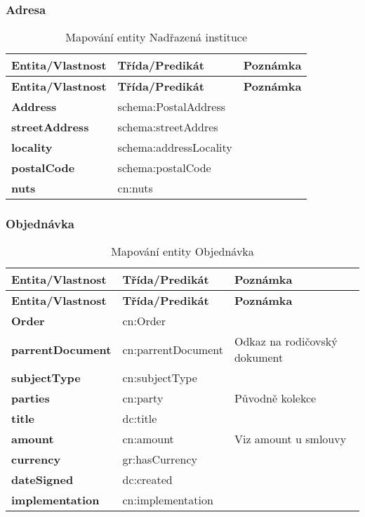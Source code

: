\subsubsection*{Adresa}

\begin{center}
\begin{longtable}{lp{30mm}p{65mm}}
\label{grid_mlmmh} \\
\multicolumn{1}{l}{\textbf{Entita/Vlastnost}} & 
\multicolumn{1}{l}{\textbf{Třída/Predikát}} & 
\multicolumn{1}{l}{\textbf{Poznámka}} \\ \hline 
\endfirsthead
\multicolumn{1}{l}{\textbf{Entita/Vlastnost}} & 
\multicolumn{1}{l}{\textbf{Třída/Predikát}} & 
\multicolumn{1}{l}{\textbf{Poznámka}} \\ \hline 
\hline
\endhead
\endfoot
\caption{Mapování entity Nadřazená instituce}
\endlastfoot
\textbf{Address} & schema:PostalAddress & \\
\textbf{streetAddress} & schema:streetAddres \\
\textbf{locality} & schema:addressLocality \\
\textbf{postalCode} & schema:postalCode \\
\textbf{nuts} & cn:nuts \\
\end{longtable}
\end{center}

\subsubsection*{Objednávka}

\begin{center}
\begin{longtable}{lp{30mm}p{65mm}}
\label{grid_mlmmh} \\
\multicolumn{1}{l}{\textbf{Entita/Vlastnost}} & 
\multicolumn{1}{l}{\textbf{Třída/Predikát}} & 
\multicolumn{1}{l}{\textbf{Poznámka}} \\ \hline 
\endfirsthead
\multicolumn{1}{l}{\textbf{Entita/Vlastnost}} & 
\multicolumn{1}{l}{\textbf{Třída/Predikát}} & 
\multicolumn{1}{l}{\textbf{Poznámka}} \\ \hline 
\hline
\endhead
\endfoot
\caption{Mapování entity Objednávka}
\endlastfoot
\textbf{Order} & cn:Order \\
\textbf{parrentDocument} & cn:parrentDocument & Odkaz na rodičovský dokument \\
\textbf{subjectType} & cn:subjectType \\
\textbf{parties} & cn:party & Původně kolekce \\
\textbf{title} & dc:title \\
\textbf{amount} & cn:amount & Viz amount u smlouvy \\
\textbf{currency} & gr:hasCurrency \\
\textbf{dateSigned} & dc:created \\
\textbf{implementation} & cn:implementation \\
\end{longtable}
\end{center}

